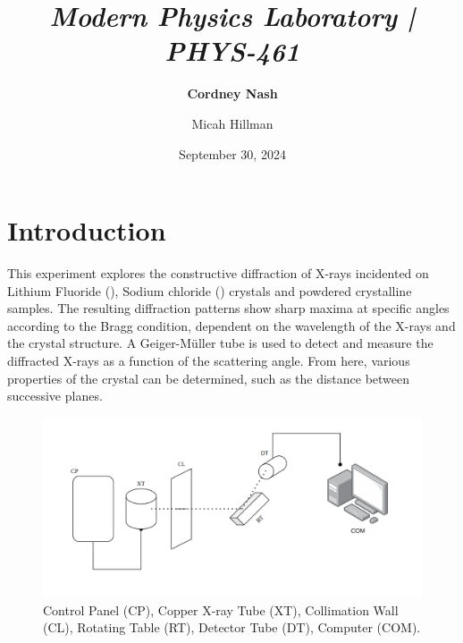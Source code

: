 \documentclass[a4paper,12pt,english]{all-in-one} %
\title{{\large\textit{Modern Physics Laboratory | PHYS-461}}\\[0.5cm]{\Huge\color{gray}\textsc{\@docsubtitle}}}
\author{\textbf{Cordney Nash}  \and Micah Hillman}
\date{September 30, 2024}
\begin{document}
\begin{titlepage}
\maketitle\vfill
\end{titlepage}
\newpage


\section*{Introduction}
{
This experiment explores the constructive diffraction of X-rays incidented on Lithium Fluoride (), Sodium chloride () crystals and powdered crystalline samples. The resulting diffraction patterns show sharp maxima at specific angles according to the Bragg condition, dependent on the wavelength of the X-rays and the crystal structure. A Geiger-Müller tube is used to detect and measure the diffracted X-rays as a function of the scattering angle. From here, various properties of the crystal can be determined, such as the distance between successive planes.
}

\begin{figure}[tbh]
    \centering
    \includegraphics[width=0.8\linewidth]{3-xray/overleaf/images/xray_diagram.png}
    \caption{ \scriptsize{ Control Panel (CP), Copper X-ray Tube (XT), Collimation Wall (CL), Rotating Table (RT), Detector Tube (DT), Computer (COM).
    }}
    \label{fig:xray-diagram}
\end{figure}
\end{document}
